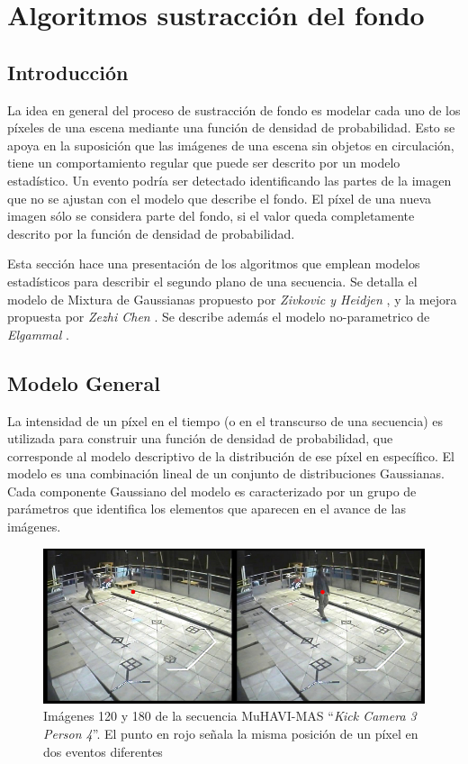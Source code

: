 \chapter{Algoritmos sustracción del fondo}

\section{Introducción}


La idea en general del proceso de sustracción de fondo es modelar cada uno de los píxeles de una escena mediante una función de densidad de probabilidad. Esto se apoya en la suposición que las imágenes de una escena sin objetos en circulación, tiene un comportamiento regular que puede ser descrito por un modelo estadístico. Un evento podría ser detectado identificando las partes de la imagen que no se ajustan con el modelo que describe el fondo. El píxel de una nueva imagen sólo se considera parte del fondo, si el valor queda completamente descrito por la función de densidad de probabilidad. 

Esta sección hace una presentación de los algoritmos que emplean modelos estadísticos para describir el segundo plano de una secuencia. Se detalla el modelo de Mixtura de Gaussianas propuesto por \textit{Zivkovic y Heidjen} \cite{zivkovic_efficient_2006}, y la mejora propuesta por \textit{Zezhi Chen} \cite{chen_vehicle_2012}. Se describe además el modelo no-parametrico de \textit{Elgammal} \cite{elgammal_nonparametricmodel_2000}.


\section{Modelo General}

La intensidad de un píxel en el tiempo (o en el transcurso de una secuencia) es utilizada para construir una función de densidad de probabilidad, que corresponde al modelo descriptivo de la distribución de ese píxel en específico. El modelo es una combinación lineal de un conjunto de distribuciones Gaussianas. Cada componente Gaussiano del modelo es caracterizado por un grupo de parámetros que identifica los elementos que aparecen en el avance de las imágenes.

\begin{figure}[h!]
  \centering
      \includegraphics[scale=0.5]{img/figura_3_1}
  \caption[Imágenes 120, 180 de secuencia ``\textit{Kick Camera 3 Person 4}'']{Imágenes 120 y 180 de la secuencia MuHAVI-MAS ``\textit{Kick Camera 3 Person 4}''. El punto en rojo señala la misma posición de un píxel en dos eventos diferentes}
\label{posicion_340_160}
\end{figure}

